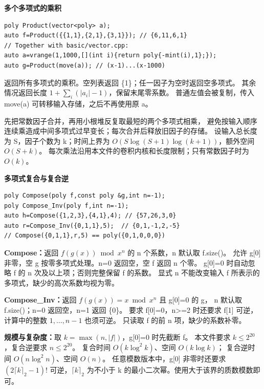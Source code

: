 \documentclass[UTF8,a4paper,10pt]{ctexart}
\begin{document}
\noindent\begin{minipage}{\textwidth}
\textbf{多个多项式的乘积}
\begin{lstlisting}
poly Product(vector<poly> a);
auto f=Product({{1,1},{2,1},{3,1}}); // {6,11,6,1}
// Together with basic/vector.cpp:
auto a=vrange(1,1000,[](int i){return poly{-mint(i),1};});
auto g=Product(move(a)); // (x-1)...(x-1000)
\end{lstlisting}
返回所有多项式的乘积。空列表返回 \{1\}；任一因子为空时返回空多项式。
其余情况返回长度 $1+\sum_i(\lvert a_i\rvert-1)$，保留末尾零系数。
普通左值会被复制，传入 move(a) 可转移输入存储，之后不再使用原 a。

先把常数因子合并，再用小根堆反复取最短的两个多项式相乘，
避免按输入顺序连续乘造成中间多项式过早变长；每次合并后释放旧因子的存储。
设输入总长度为 S，因子个数为 k；时间上界为
$O(S\log(S+1)\log(k+1))$，额外空间 $O(S+k)$。
每次乘法沿用本文件的卷积内核和长度限制；只有常数因子时为 $O(k)$。
\end{minipage}\par\vspace{0.4em}
\noindent\begin{minipage}{\textwidth}
\textbf{多项式复合与复合逆}
\begin{lstlisting}
poly Compose(poly f,const poly &g,int n=-1);
poly Compose_Inv(poly f,int n=-1);
auto h=Compose({1,2,3},{4,1},4); // {57,26,3,0}
auto r=Compose_Inv({0,1,1},5);  // {0,1,-1,2,-5}
// Compose({0,1,1},r,5) == poly({0,1,0,0,0})
\end{lstlisting}
\textbf{Compose：}返回 $f(g(x))\bmod x^n$ 的 n 个系数，n 默认取 f.size()。
允许 g[0] 非零，空 g 按零多项式处理。n=0 返回空，空 f 返回 n 个零。
g[0]=0 时自动忽略 f 的 n 次及以上项；否则完整保留 f 的系数。
显式 n 不能改变输入 f 所表示的多项式，缺少的高次系数均视为零。

\textbf{Compose\_Inv：}返回 $f(g(x))=x\bmod x^n$ 且 g[0]=0 的 g，
n 默认取 f.size()；n=0 返回空，n=1 返回 \{0\}。
要求 f[0]=0，n>=2 时还要求 f[1] 可逆，计算中的整数 $1,\ldots,n-1$ 也须可逆。
只读取 f 的前 n 项，缺少的系数补零。

\textbf{规模与复杂度：}取 $k=\max(n,\lvert f\rvert)$，g[0]=0 时先截断 f。
本文件要求 $k\le 2^{20}$，复合逆要求 $n\le 2^{20}$。
复合时间 $O(k\log^2 k)$、空间 $O(k\log k)$；
复合逆时间 $O(n\log^2 n)$、空间 $O(n)$。
任意模数版本中，g[0] 非零时还要求 $(2\lceil k\rceil_2-1)!$ 可逆，$\lceil k\rceil_2$ 为不小于 k 的最小二次幂。使用大于该界的质数模数即可。
\end{minipage}\par\vspace{0.4em}
\end{document}
